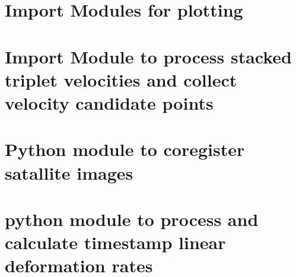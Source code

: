 \documentclass[letterpaper,10pt]{sphinxmanual}
\begin{document}
\section{Import Modules for plotting}
\label{\detokenize{README:import-modules-for-plotting}}
\begin{sphinxVerbatim}[commandchars=\\\{\}]
   
   
   
   
\end{sphinxVerbatim}


\section{Import Module to process stacked triplet velocities and collect velocity candidate points}
\label{\detokenize{README:import-module-to-process-stacked-triplet-velocities-and-collect-velocity-candidate-points}}
\begin{sphinxVerbatim}[commandchars=\\\{\}]
   
\end{sphinxVerbatim}


\section{Python module to coregister satallite images}
\label{\detokenize{README:python-module-to-coregister-satallite-images}}
\begin{sphinxVerbatim}[commandchars=\\\{\}]
     
\end{sphinxVerbatim}


\section{python module to process and calculate timestamp linear deformation rates}
\label{\detokenize{README:python-module-to-process-and-calculate-timestamp-linear-deformation-rates}}
\begin{sphinxVerbatim}[commandchars=\\\{\}]
    
\end{sphinxVerbatim}
\end{document}
